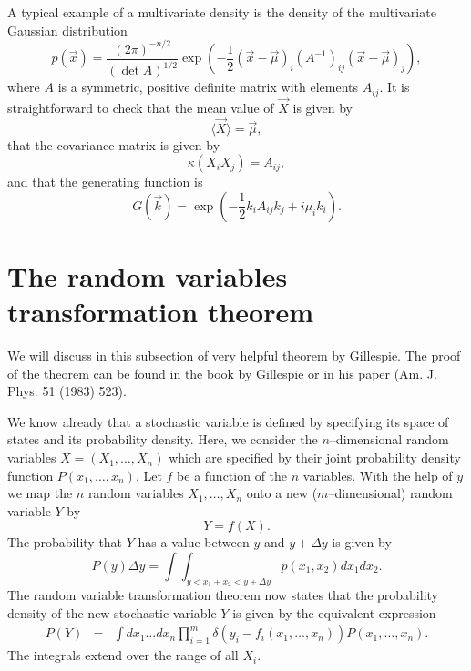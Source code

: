 A typical example of a multivariate density is the density of the multivariate 
Gaussian distribution
\begin{equation}
p(\vec{x}) = \frac{(2\pi)^{-n/2}}{(\det A)^{1/2}}
     \exp\left( -\frac{1}{2} (\vec{x} - \vec{\mu})_i (A^{-1})_{ij} 
     (\vec{x}-\vec{\mu})_j \right),
\end{equation}
where $A$ is a symmetric, positive definite matrix with elements 
$A_{ij}$. It is straightforward to check that the mean value of $\vec{X}$
is given by
\begin{equation}
\langle \vec{X} \rangle = \vec{\mu},
\end{equation}
that the covariance matrix is given by
\begin{equation}
\kappa(X_i X_j) = A_{ij},
\end{equation}
and that the generating function is
\begin{equation}
G(\vec{k}) = \exp(-\frac{1}{2} k_i A_{ij} k_j + i \mu_ik_i).
\end{equation}

\section{The random variables transformation theorem}
We will discuss in this subsection of very helpful theorem by 
Gillespie. The proof of the theorem can be found in the book by
Gillespie or in his paper (Am. J. Phys. 51 (1983) 523). 

We know already that a stochastic variable is defined by 
specifying its space of states and its probability density.
Here, we consider the $n$--dimensional random variables $X=(X_1, \ldots, X_n)$ 
which are specified by their joint probability density function
$P(x_1, \ldots, x_n)$. Let $f$ be a function of the $n$ variables. With the 
help of $y$ we map the $n$ random variables $X_1, \ldots, X_n$ 
onto a new ($m$--dimensional) random variable $Y$ by
\begin{equation}
Y = f(X).
\end{equation}
The probability that $Y$ has a value between $y$ and $y+\Delta y$
is given by
\begin{equation}
P(y) \Delta y = \int \int_{y<x_1+x_2 <y+\Delta y} p(x_1,x_2) dx_1 
dx_2.
\end{equation}
The random variable transformation theorem now states that the 
probability density of the new stochastic variable $Y$ is given by
the equivalent expression
\begin{eqnarray}
\label{RVT}
P(Y) &=& \int dx_1 \ldots dx_n \prod_{i=1}^{m} 
\delta(y_i - f_i(x_1, \ldots, x_n)) P(x_1, \ldots, x_n).
\end{eqnarray}
The integrals extend over the range of all $X_i$.

